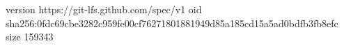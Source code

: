 version https://git-lfs.github.com/spec/v1
oid sha256:0fdc69cbe3282c959fe00cf76271801881949d85a185cd15a5ad0bdfb3fb8efc
size 159343

